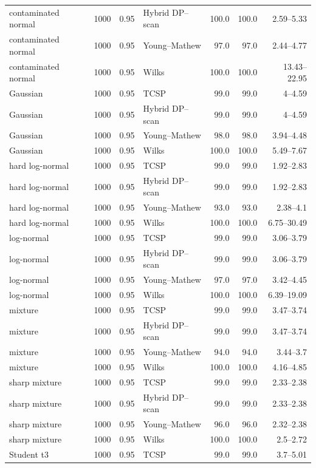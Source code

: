 \begin{longtable}{@{}p{}rrp{}rrr@{}}
contaminated normal & 1000 & 0.95 & Hybrid DP--scan & 100.0 & 100.0 & 2.59--5.33 \\
contaminated normal & 1000 & 0.95 & Young--Mathew & 97.0 & 97.0 & 2.44--4.77 \\
contaminated normal & 1000 & 0.95 & Wilks & 100.0 & 100.0 & 13.43--22.95 \\
Gaussian & 1000 & 0.95 & TCSP & 99.0 & 99.0 & 4--4.59 \\
Gaussian & 1000 & 0.95 & Hybrid DP--scan & 99.0 & 99.0 & 4--4.59 \\
Gaussian & 1000 & 0.95 & Young--Mathew & 98.0 & 98.0 & 3.94--4.48 \\
Gaussian & 1000 & 0.95 & Wilks & 100.0 & 100.0 & 5.49--7.67 \\
hard log-normal & 1000 & 0.95 & TCSP & 99.0 & 99.0 & 1.92--2.83 \\
hard log-normal & 1000 & 0.95 & Hybrid DP--scan & 99.0 & 99.0 & 1.92--2.83 \\
hard log-normal & 1000 & 0.95 & Young--Mathew & 93.0 & 93.0 & 2.38--4.1 \\
hard log-normal & 1000 & 0.95 & Wilks & 100.0 & 100.0 & 6.75--30.49 \\
log-normal & 1000 & 0.95 & TCSP & 99.0 & 99.0 & 3.06--3.79 \\
log-normal & 1000 & 0.95 & Hybrid DP--scan & 99.0 & 99.0 & 3.06--3.79 \\
log-normal & 1000 & 0.95 & Young--Mathew & 97.0 & 97.0 & 3.42--4.45 \\
log-normal & 1000 & 0.95 & Wilks & 100.0 & 100.0 & 6.39--19.09 \\
mixture & 1000 & 0.95 & TCSP & 99.0 & 99.0 & 3.47--3.74 \\
mixture & 1000 & 0.95 & Hybrid DP--scan & 99.0 & 99.0 & 3.47--3.74 \\
mixture & 1000 & 0.95 & Young--Mathew & 94.0 & 94.0 & 3.44--3.7 \\
mixture & 1000 & 0.95 & Wilks & 100.0 & 100.0 & 4.16--4.85 \\
sharp mixture & 1000 & 0.95 & TCSP & 99.0 & 99.0 & 2.33--2.38 \\
sharp mixture & 1000 & 0.95 & Hybrid DP--scan & 99.0 & 99.0 & 2.33--2.38 \\
sharp mixture & 1000 & 0.95 & Young--Mathew & 96.0 & 96.0 & 2.32--2.38 \\
sharp mixture & 1000 & 0.95 & Wilks & 100.0 & 100.0 & 2.5--2.72 \\
Student t3 & 1000 & 0.95 & TCSP & 99.0 & 99.0 & 3.7--5.01 \\

\end{longtable}
